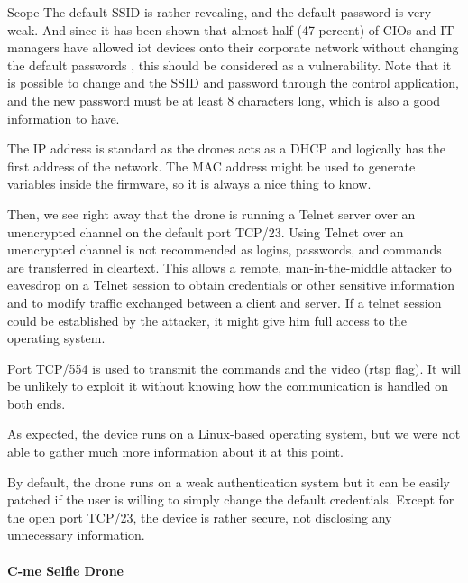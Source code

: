 \begin{chaptercover}{Scope}
The default SSID is rather revealing, and the default password is very weak. And since it has been shown that almost half (47 percent) of CIOs and IT managers have allowed \acrshort{iot} devices onto their corporate network without changing the default passwords \cite{iot-security-default-passwords}, this should be considered as a vulnerability. Note that it is possible to change and the SSID and password through the control application, and the new password must be at least 8 characters long, which is also a good information to have.

The IP address is standard as the drones acts as a DHCP and logically has the first address of the network. The MAC address might be used to generate variables inside the firmware, so it is always a nice thing to know.

Then, we see right away that the drone is running a Telnet server over an unencrypted channel on the default port TCP/23. Using Telnet over an unencrypted channel is not recommended as logins, passwords, and commands are transferred in cleartext. This allows a remote, man-in-the-middle attacker to eavesdrop on a Telnet session to obtain credentials or other sensitive information and to modify traffic exchanged between a client and server. If a telnet session could be established by the attacker, it might give him full access to the operating system.

Port TCP/554 is used to transmit the commands and the video (rtsp flag). It will be unlikely to exploit it without knowing how the communication is handled on both ends.

As expected, the device runs on a Linux-based operating system, but we were not able to gather much more information about it at this point.

\begin{tip}
By default, the drone runs on a weak authentication system but it can be easily patched if the user is willing to simply change the default credentials.
Except for the open port TCP/23, the device is rather secure, not disclosing any unnecessary information.
\end{tip}

\paragraph{C-me Selfie Drone}


\end{chaptercover}
